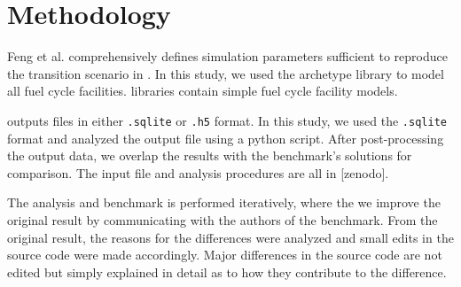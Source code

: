\section{Methodology}

Feng et al. comprehensively defines simulation parameters
sufficient to reproduce the transition scenario in \Cyclus.
In this study, we used the \Cycamore \cite{huff_fundamental_2016}
 archetype library to model
all fuel cycle facilities. \Cycamore libraries contain
simple fuel cycle facility models. 

\Cyclus outputs files in either \texttt{.sqlite} or
\texttt{.h5} format. In this study, we used the
\texttt{.sqlite} format and analyzed the output file
using a python script. After post-processing the
output data, we overlap the results with the
benchmark's solutions for comparison. The input file
and analysis procedures are all in [zenodo].

The analysis and benchmark is performed iteratively,
where the we improve the original result by communicating
with the authors of the benchmark. From the original result,
the reasons for the differences were analyzed and
small edits in the source code were made accordingly.
Major differences in the source code are not edited but
simply explained in detail as to how they contribute
to the difference.
